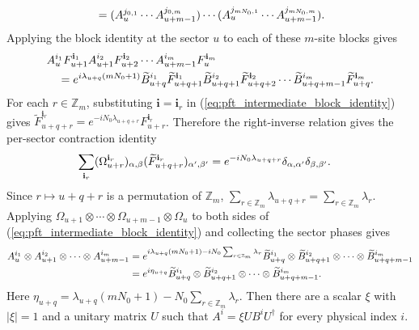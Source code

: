 \begin{lemma}
\begin{align}
         & \quad=
        (A_u^{j_{0,1}}\cdots A_{u+m-1}^{j_{0,m}})
        \cdots
        (A_u^{j_{mN_0,1}}\cdots A_{u+m-1}^{j_{mN_0,m}}).
        \notag
    \end{align}
    Applying the block identity at the sector $u$ to each of these $m$-site
    blocks gives
    \begin{align}
         & A_u^{i_1}F_{u+1}^{\mathbf i_1}
        A_{u+1}^{i_2}F_{u+2}^{\mathbf i_2}
        \cdots
        A_{u+m-1}^{i_m}F_u^{\mathbf i_m}
        \notag                            \\
         & \quad=
        e^{i\lambda_{u+q}(mN_0+1)}
        \widetilde B_{u+q}^{i_1}\widetilde F_{u+q+1}^{\mathbf i_1}
        \widetilde B_{u+q+1}^{i_2}\widetilde F_{u+q+2}^{\mathbf i_2}
        \cdots
        \widetilde B_{u+q+m-1}^{i_m}\widetilde F_{u+q}^{\mathbf i_m}.
        \label{eq:pft_intermediate_block_identity}
    \end{align}
    For each $r\in\mathbb Z_m$, substituting $\mathbf i=\mathbf i_r$ in
    (\ref{eq:pft_intermediate_block_identity}) gives
    $\widetilde F_{u+q+r}^{\mathbf i_r}
        =e^{-iN_0\lambda_{u+q+r}}F_{u+r}^{\mathbf i_r}$.
    Therefore the right-inverse relation gives the per-sector contraction
    identity
    \begin{align}
        \sum_{\mathbf i_r}
        (\Omega_{u+r}^{\mathbf i_r})_{\alpha,\beta}
        (\widetilde F_{u+q+r}^{\mathbf i_r})_{\alpha',\beta'}
         & =
        e^{-iN_0\lambda_{u+q+r}}
        \delta_{\alpha,\alpha'}\delta_{\beta,\beta'}.
        \notag
    \end{align}
    Since $r\mapsto u+q+r$ is a permutation of $\mathbb Z_m$,
    $\sum_{r\in\mathbb Z_m}\lambda_{u+q+r}
        =\sum_{r\in\mathbb Z_m}\lambda_r$.
    Applying
    $\Omega_{u+1}\otimes\cdots\otimes\Omega_{u+m-1}\otimes\Omega_u$ to both
    sides of (\ref{eq:pft_intermediate_block_identity}) and collecting the
    sector phases gives
    \begin{align}
        A_u^{i_1}\otimes A_{u+1}^{i_2}\otimes\cdots\otimes A_{u+m-1}^{i_m}
         & =
        e^{i\lambda_{u+q}(mN_0+1)-iN_0\sum_{r\in\mathbb Z_m}\lambda_r}
        \widetilde B_{u+q}^{i_1}\otimes\widetilde B_{u+q+1}^{i_2}
        \otimes\cdots\otimes\widetilde B_{u+q+m-1}^{i_m}
        \notag \\
         & =
        e^{i\eta_{u+q}}
        \widetilde B_{u+q}^{i_1}\otimes\widetilde B_{u+q+1}^{i_2}
        \otimes\cdots\otimes\widetilde B_{u+q+m-1}^{i_m}.
        \notag
    \end{align}
    Here
    $\eta_{u+q}=\lambda_{u+q}(mN_0+1)
        -N_0\sum_{r\in\mathbb Z_m}\lambda_r$.
    Then there are a scalar $\xi$ with $|\xi|=1$ and a unitary matrix $U$
    such that
    $A^i=\xi UB^iU^\dagger$ for every physical index $i$.
\end{lemma}

